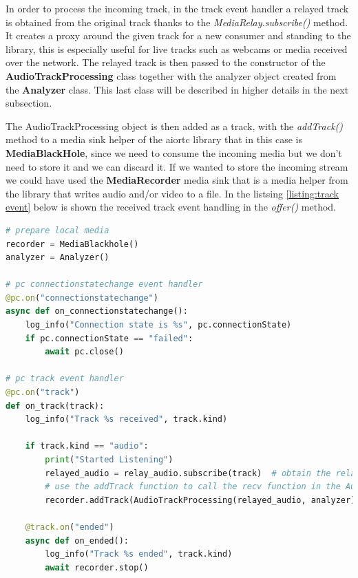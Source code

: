 \documentclass[../main.tex]{subfiles}
\begin{document}
In order to process the incoming track, in the track event handler a relayed track is obtained from the original track thanks to the \textit{MediaRelay.subscribe()} method. It creates a proxy around the given track for a new consumer and standing to the library, this is especially useful for live tracks such as webcams or media received over the network. The relayed track is then passed to the constructor of the \textbf{AudioTrackProcessing} class together with the analyzer object created from the \textbf{Analyzer} class. This last class will be described in higher details in the next subsection.

The AudioTrackProcessing object is then added as a track, with the \textit{addTrack()} method to a media sink helper of the aiortc library that in this case is \textbf{MediaBlackHole}, since we need to consume the incoming media but we don't need to store it and we can discard it. If we wanted to store the incoming stream we could have used the \textbf{MediaRecorder} media sink that is a media helper from the library that writes audio and/or video to a file. In the listsing \ref{listing:track event} below is shown the received track event handling in the \textit{offer()} method.

\begin{lstlisting}[language=Python, caption=Track event handling]
# prepare local media
recorder = MediaBlackhole()
analyzer = Analyzer()

# pc connectionstatechange event handler
@pc.on("connectionstatechange")
async def on_connectionstatechange():
    log_info("Connection state is %s", pc.connectionState)
    if pc.connectionState == "failed":
        await pc.close()

# pc track event handler
@pc.on("track")
def on_track(track):
    log_info("Track %s received", track.kind)

    if track.kind == "audio":
        print("Started Listening")
        relayed_audio = relay_audio.subscribe(track)  # obtain the relayed track
        # use the addTrack function to call the recv function in the AudioTrackProcessing class on the relayed track
        recorder.addTrack(AudioTrackProcessing(relayed_audio, analyzer))

    @track.on("ended")
    async def on_ended():
        log_info("Track %s ended", track.kind)
        await recorder.stop()
\end{lstlisting}
\label{listing:track event}
\end{document}
